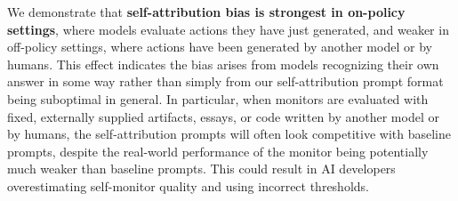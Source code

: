 

We demonstrate that \textbf{self-attribution bias is strongest in on-policy settings}, where models evaluate actions they have just generated, and weaker in off-policy settings, where actions have been generated by another model or by humans. This effect indicates the bias arises from models recognizing their own answer in some way rather than simply from our self-attribution prompt format being suboptimal in general. In particular, when monitors are evaluated with fixed, externally supplied artifacts, essays, or code written by another model or by humans, the self-attribution prompts will often look competitive with baseline prompts, despite the real-world performance of the monitor being potentially much weaker than baseline prompts. This could result in AI developers overestimating self-monitor quality and using incorrect thresholds. 


